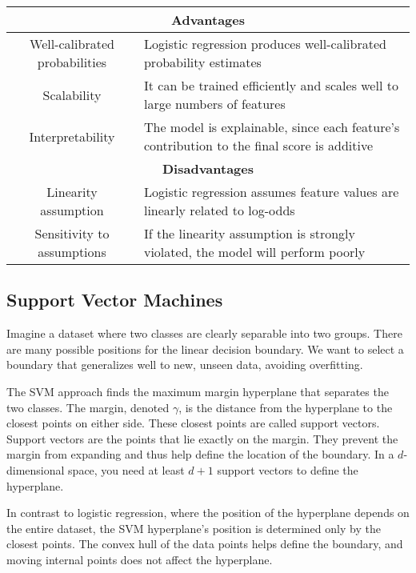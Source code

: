 \renewcommand*{\arraystretch}{1.5}
\begin{table}[!ht]
    \centering
    \begin{tabular}{|c|p{10cm}|}
    \hline
    \multicolumn{2}{|c|}{\textbf{Advantages}} \\ \hline
    Well-calibrated probabilities   & Logistic regression produces well-calibrated probability estimates  \\ \hline
    Scalability                     & It can be trained efficiently and scales well to large numbers of features \\ \hline
    Interpretability                & The model is explainable, since each feature's contribution to the final score is additive \\ \hline
    \multicolumn{2}{|c|}{\textbf{Disadvantages}} \\ \hline
    Linearity assumption            & Logistic regression assumes feature values are linearly related to log-odds \\ \hline
    Sensitivity to assumptions      & If the linearity assumption is strongly violated, the model will perform poorly \\ \hline
    \end{tabular}
\end{table}
\renewcommand*{\arraystretch}{1}

\subsection{Support Vector Machines}
Imagine a dataset where two classes are clearly separable into two groups.
There are many possible positions for the linear decision boundary.
We want to select a boundary that generalizes well to new, unseen data, avoiding overfitting.

The SVM approach finds the maximum margin hyperplane that separates the two classes. 
The margin, denoted $\gamma$, is the distance from the hyperplane to the closest points on either side.
These closest points are called support vectors.
Support vectors are the points that lie exactly on the margin.
They prevent the margin from expanding and thus help define the location of the boundary.
In a $d$-dimensional space, you need at least $d+1$ support vectors to define the hyperplane.

In contrast to logistic regression, where the position of the hyperplane depends on the entire dataset, the SVM hyperplane's position is determined only by the closest points.
The convex hull of the data points helps define the boundary, and moving internal points does not affect the hyperplane.

